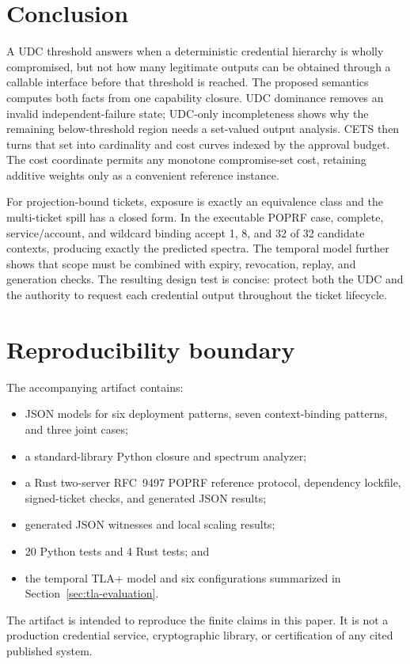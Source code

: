 \documentclass[preprint,12pt]{elsarticle}
\begin{document}
\section{Conclusion}

A UDC threshold answers when a deterministic credential hierarchy is wholly
compromised, but not how many legitimate outputs can be obtained through a
callable interface before that threshold is reached.  The proposed semantics
computes both facts from one capability closure.  UDC dominance removes an
invalid independent-failure state; UDC-only incompleteness shows why the
remaining below-threshold region needs a set-valued output analysis.  CETS then
turns that set into cardinality and cost curves indexed by the approval budget.
The cost coordinate permits any monotone compromise-set cost, retaining
additive weights only as a convenient reference instance.

For projection-bound tickets, exposure is exactly an equivalence class and the
multi-ticket spill has a closed form.  In the executable POPRF case, complete,
service/account, and wildcard binding accept 1, 8, and 32 of 32 candidate
contexts, producing exactly the predicted spectra.  The temporal model further
shows that scope must be combined with expiry, revocation, replay, and
generation checks.  The resulting design test is concise: protect both the
UDC and the authority to request each credential output throughout
the ticket lifecycle.

\appendix

\section{Reproducibility boundary}

The accompanying artifact contains:

\begin{itemize}[leftmargin=*]
\item JSON models for six deployment patterns, seven context-binding patterns,
  and three joint cases;
\item a standard-library Python closure and spectrum analyzer;
\item a Rust two-server RFC~9497 POPRF reference protocol, dependency lockfile,
  signed-ticket checks, and generated JSON results;
\item generated JSON witnesses and local scaling results;
\item 20 Python tests and 4 Rust tests; and
\item the temporal TLA+ model and six configurations summarized in
  Section~\ref{sec:tla-evaluation}.
\end{itemize}

The artifact is intended to reproduce the finite claims in this paper.  It is
not a production credential service, cryptographic library, or certification of
any cited published system.



\end{document}
